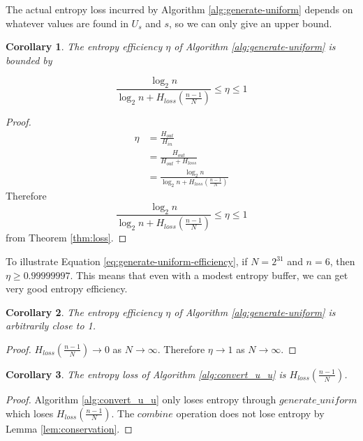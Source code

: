 \documentclass[12pt]{article}
\newtheorem{corollary}{Corollary}
\begin{document}
The actual entropy loss incurred by Algorithm \ref{alg:generate-uniform} depends on whatever values are found in $U_s$ and $s$, so we can only give an upper bound.

\begin{corollary}
The entropy efficiency $\eta$ of Algorithm \ref{alg:generate-uniform} is bounded by

\begin{equation}
\frac{\log_2n}{\log_2n + H_{loss}(\frac{n-1}{N})} \le \eta \le 1
\label{eq:generate-uniform-efficiency}
\end{equation}
\end{corollary}

\begin{proof}
\begin{align}
    \eta & = \frac{H_{out}}{H_{in}} \\
         & = \frac{H_{out}}{H_{out}+H_{loss}} \\
         & = \frac{\log_2n}{\log_2n + H_{loss}(\frac{n-1}{N})}
\end{align}
Therefore 
\begin{equation}
\frac{\log_2n}{\log_2n + H_{loss}(\frac{n-1}{N})} \le \eta \le 1
\end{equation}
from Theorem \ref{thm:loss}.
\end{proof}

To illustrate Equation \ref{eq:generate-uniform-efficiency}, if $N=2^{31}$ and $n=6$, then $\eta \ge 0.99999997$. This means that even with a modest entropy buffer, we can get very good entropy efficiency.

\begin{corollary}
The entropy efficiency $\eta$ of Algorithm \ref{alg:generate-uniform} is arbitrarily close to 1.
\end{corollary}

\begin{proof}
$H_{loss}(\frac{n-1}{N}) \rightarrow 0$ as $N \rightarrow \infty$. Therefore $\eta \rightarrow 1$ as $N \rightarrow \infty$.
\end{proof}


\begin{corollary}
The entropy loss of Algorithm \ref{alg:convert_u_u} is $H_{loss}(\frac{n-1}{N})$.
\end{corollary}

\begin{proof}
    Algorithm \ref{alg:convert_u_u} only loses entropy through $generate\_uniform$ which loses $H_{loss}(\frac{n-1}{N})$. The $combine$ operation does not lose entropy by Lemma \ref{lem:conservation}.
\end{proof}
\end{document}
